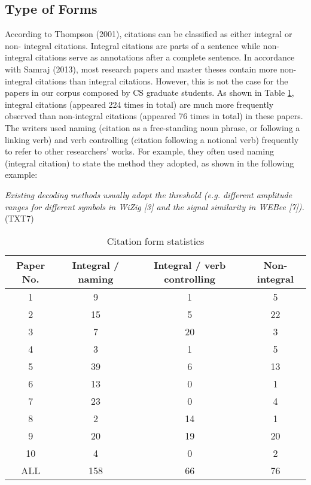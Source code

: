 \subsection{Type of Forms}
According to Thompson (2001), citations can be classified as either integral or non- integral citations. Integral citations are parts of a sentence while non-integral citations serve as annotations after a complete sentence. In accordance with Samraj (2013), most research papers and master theses contain more non-integral citations than integral citations. However, this is not the case for the papers in our corpus composed by CS graduate students. As shown in Table \ref{tab:citation_form}, integral citations (appeared 224 times in total) are much more frequently observed than non-integral citations (appeared 76 times in total) in these papers. The writers used naming (citation as a free-standing noun phrase, or following a linking verb) and verb controlling (citation following a notional verb) frequently to refer to other researchers’ works. For example, they often used naming (integral citation) to state the method they adopted, as shown in the following example:

\textit{Existing decoding methods usually adopt the threshold (e.g. different amplitude ranges for different symbols in WiZig [3] and the signal similarity in WEBee [7]).} (TXT7)

\begin{table}[thb]
    \caption{Citation form statistics}
    \centering
      \begin{tabular}{cccc}
        \toprule[1.5pt]
        \textbf{Paper No.} & \textbf{Integral / naming} & \textbf{Integral / verb controlling} & \textbf{Non-integral} \\
        \midrule[1pt]
        1 & 9 & 1 & 5 \\
        2 & 15 & 5 & 22 \\
        3 & 7 & 20 & 3 \\ 
        4 & 3 & 1 & 5 \\
        5 & 39 & 6 & 13 \\
        6 & 13 & 0 & 1 \\
        7 & 23 & 0 & 4 \\
        8 & 2 & 14 & 1 \\
        9 & 20 & 19 & 20 \\
        10 & 4 & 0 & 2 \\ 
        ALL & 158 & 66 & 76 \\
        
      \bottomrule[1.5pt]
    \end{tabular}
    \label{tab:citation_form}
  \end{table}

